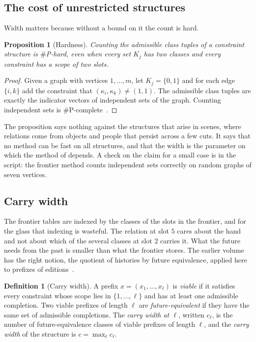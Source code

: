 \documentclass[11pt,twoside,openright]{book}
\theoremstyle{plain}
\newtheorem{proposition}[theorem]{Proposition}
\theoremstyle{definition}
\newtheorem{definition}[theorem]{Definition}
\theoremstyle{remark}
\begin{document}
\subsection{The cost of unrestricted structures}

Width matters because without a bound on it the count is hard.

\begin{proposition}[Hardness]\label{prop:hard}
Counting the admissible class tuples of a constraint structure is $\#$P-hard, even when every set $K_j$ has two classes and every constraint has a scope of two slots.
\end{proposition}

\begin{proof}
Given a graph with vertices $1,\dots,m$, let $K_j=\{0,1\}$ and for each edge $\{i,k\}$ add the constraint that $(\kappa_i,\kappa_k)\ne(1,1)$. The admissible class tuples are exactly the indicator vectors of independent sets of the graph. Counting independent sets is $\#$P-complete~\cite{provanball1983}.
\end{proof}

The proposition says nothing against the structures that arise in scenes, where relations come from objects and people that persist across a few cuts. It says that no method can be fast on all structures, and that the width is the parameter on which the method of  depends. A check on the claim for a small case is in the script: the frontier method counts independent sets correctly on random graphs of seven vertices.

\subsection{Carry width}

The frontier tables are indexed by the classes of the slots in the frontier, and for the glass that indexing is wasteful. The relation at slot $5$ cares about the hand and not about which of the several classes at slot $2$ carries it. What the future needs from the past is smaller than what the frontier stores. The earlier volume has the right notion, the quotient of histories by future equivalence, applied here to prefixes of editions~\cite{flyxion2026gf,hopcroft2006}.

\begin{definition}[Carry width]\label{def:carry}
A prefix $x=(x_1,\dots,x_\ell)$ is \emph{viable} if it satisfies every constraint whose scope lies in $\{1,\dots,\ell\}$ and has at least one admissible completion. Two viable prefixes of length $\ell$ are \emph{future-equivalent} if they have the same set of admissible completions. The \emph{carry width at $\ell$}, written $c_\ell$, is the number of future-equivalence classes of viable prefixes of length $\ell$, and the \emph{carry width} of the structure is $c=\max_\ell c_\ell$.
\end{definition}
\end{document}
